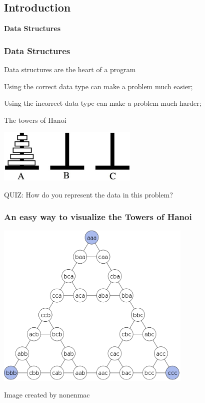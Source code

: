 \documentclass{beamer}
\begin{document}
\subsection{Introduction}

\begin{frame}
  \begin{center}
    {\bf Data Structures}
  \end{center}
\end{frame}

\begin{frame}
  \frametitle{Data Structures}

  \begin{block}{Data structures are the heart of a program}
    \begin{itemize}
      {\small
      \item Using the correct data type can make a problem much easier;
      \item Using the incorrect data type can make a problem much harder;
      }
    \end{itemize}
  \end{block}

  \begin{block}{The towers of Hanoi}
    \begin{center}
    \includegraphics[width=0.5\textwidth]{img/hanoi}
    \end{center}
    \medskip
    QUIZ: How do you represent the data in this problem? 
  \end{block}
\end{frame}

\begin{frame}
  \frametitle{An easy way to visualize the Towers of Hanoi}
  \begin{center}
    \includegraphics[width=0.7\textwidth]{img/hanoi_graph}
  \end{center}
  {\smaller Image created by nonenmac}
\end{frame}
\end{document}
